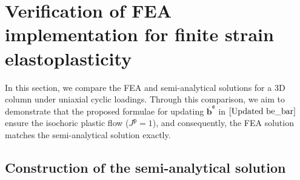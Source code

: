 \documentclass[preprint,11pt]{elsarticle}
\theoremstyle{definition}
\begin{document}
\section{Verification of FEA implementation for finite strain elastoplasticity}
\label{Sec: FEA Verification}

In this section, we compare the FEA and semi-analytical solutions for a 3D column under uniaxial cyclic loadings. Through this comparison, we aim to demonstrate that the proposed formulae for updating $\overline{\mathbf{b}}^\texttt{e}$ in $\eqref{Updated be_bar}$ ensure the isochoric plastic flow ($J^\texttt{p}=1$), and consequently, the FEA solution matches the semi-analytical solution exactly.

\subsection{Construction of the semi-analytical solution}
\end{document}
